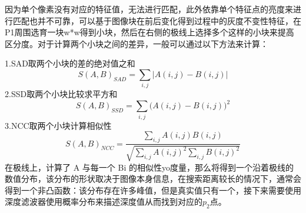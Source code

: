 因为单个像素没有对应的特征值，无法进行匹配，此外依靠单个特征点的亮度来进行匹配也并不可靠，可以基于图像块在前后变化得到过程中的灰度不变性特征，在P1周围选育一块w*w得到小块，然后在右侧的极线上选择多个这样的小块来提高区分度。对于计算两个小块之间的差异，一般可以通过以下方法来计算：

1.SAD取两个小块的差的绝对值之和
\begin{equation}
  S{(A,B)}_{SAD}=\sum_{i,j}\left|A(i,j)-B(i,j)\right|
\end{equation}
2.SSD取两个小块比较求平方和
\begin{equation}
S{(A,B)}_{SSD}=\sum_{i,j}(A(i,j)-B{(i,j))}^2
\end{equation}
3.NCC取两个小块计算相似性
\begin{equation}
  S{(A,B)}_{NCC}=\frac{{\displaystyle\sum_{i,j}}A(i,j)B(i,j)}{\sqrt{{\displaystyle\sum_{i,j}}A{(i,j)}^2\underset{i,j}\sum B{(i,j)}^2}}
\end{equation}
在极线上，计算了 A 与每一个 Bi 的相似性yo度量，那么将得到一个沿着极线的数值分布，该分布的形状取决于图像本身信息，在搜索距离较长的情况下，通常会得到一个非凸函数：该分布存在许多峰值，但是真实值只有一个，接下来需要使用深度滤波器使用概率分布来描述深度值从而找到对应的$p_2$点。

